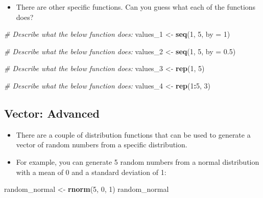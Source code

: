 \documentclass[
]{book}
\newenvironment{Shaded}{\begin{snugshade}}{\end{snugshade}}
\newcommand{\AttributeTok}[1]{\textcolor[rgb]{0.13,0.29,0.53}{#1}}
\newcommand{\CommentTok}[1]{\textcolor[rgb]{0.56,0.35,0.01}{\textit{#1}}}
\newcommand{\DecValTok}[1]{\textcolor[rgb]{0.00,0.00,0.81}{#1}}
\newcommand{\FloatTok}[1]{\textcolor[rgb]{0.00,0.00,0.81}{#1}}
\newcommand{\FunctionTok}[1]{\textcolor[rgb]{0.13,0.29,0.53}{\textbf{#1}}}
\newcommand{\NormalTok}[1]{#1}
\newcommand{\OtherTok}[1]{\textcolor[rgb]{0.56,0.35,0.01}{#1}}
\newcommand{\SpecialCharTok}[1]{\textcolor[rgb]{0.81,0.36,0.00}{\textbf{#1}}}
\providecommand{\tightlist}{%
  \setlength{\itemsep}{0pt}\setlength{\parskip}{0pt}}
\begin{document}
\begin{itemize}
\tightlist
\item
  There are other specific functions. Can you guess what each of the functions does?
\end{itemize}

\begin{Shaded}
\begin{Highlighting}[]
\CommentTok{\# Describe what the below function does: }
\NormalTok{values\_1 }\OtherTok{\textless{}{-}} \FunctionTok{seq}\NormalTok{(}\DecValTok{1}\NormalTok{, }\DecValTok{5}\NormalTok{, }\AttributeTok{by =} \DecValTok{1}\NormalTok{)}

\CommentTok{\# Describe what the below function does: }
\NormalTok{values\_2 }\OtherTok{\textless{}{-}} \FunctionTok{seq}\NormalTok{(}\DecValTok{1}\NormalTok{, }\DecValTok{5}\NormalTok{, }\AttributeTok{by =} \FloatTok{0.5}\NormalTok{)}

\CommentTok{\# Describe what the below function does: }
\NormalTok{values\_3 }\OtherTok{\textless{}{-}} \FunctionTok{rep}\NormalTok{(}\DecValTok{1}\NormalTok{, }\DecValTok{5}\NormalTok{)}

\CommentTok{\# Describe what the below function does: }
\NormalTok{values\_4 }\OtherTok{\textless{}{-}} \FunctionTok{rep}\NormalTok{(}\DecValTok{1}\SpecialCharTok{:}\DecValTok{5}\NormalTok{, }\DecValTok{3}\NormalTok{)}
\end{Highlighting}
\end{Shaded}

\subsection{Vector: Advanced}\label{vector-advanced}

\begin{itemize}
\item
  There are a couple of distribution functions that can be used to generate a vector of random numbers from a specific distribution.
\item
  For example, you can generate 5 random numbers from a normal distribution with a mean of 0 and a standard deviation of 1:
\end{itemize}

\begin{Shaded}
\begin{Highlighting}[]
\NormalTok{random\_normal }\OtherTok{\textless{}{-}} \FunctionTok{rnorm}\NormalTok{(}\DecValTok{5}\NormalTok{, }\DecValTok{0}\NormalTok{, }\DecValTok{1}\NormalTok{)}
\NormalTok{random\_normal}
\end{Highlighting}
\end{Shaded}
\end{document}
